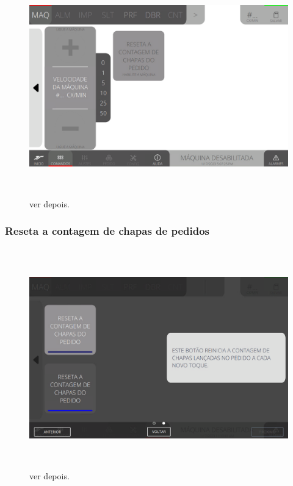 \begin{figure}[h]
  \centering
  \includegraphics[width=576px,height=360px]{src/images/02-machine/e-Tela-Principal-2.png}
  \caption{ver depois.}
   \label{}
\end{figure}

\newpage
\thispagestyle{fancy}

\vspace*{\fill}

\subsubsection{\small{Reseta a contagem de chapas de pedidos}}

\begin{figure}[h]
  \centering
  \includegraphics[width=576px,height=360px]{src/images/02-machine/e-9.png}
  \caption{ver depois.}
   \label{}
\end{figure}

\vspace*{\fill}

